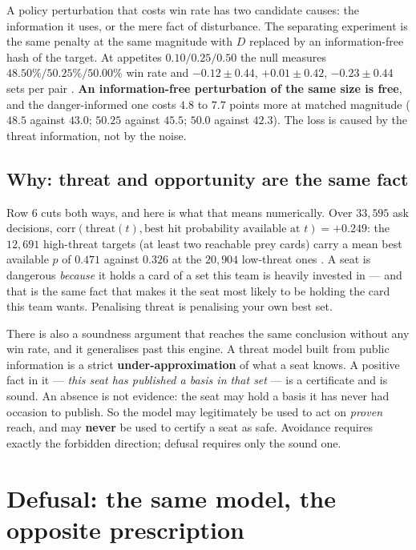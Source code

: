 \documentclass[11pt]{article}
\begin{document}
A policy perturbation that costs win rate has two candidate causes: the information it uses, or the
mere fact of disturbance. The separating experiment is the same penalty at the same magnitude with
$D$ replaced by an information-free hash of the target. At appetites $0.10 / 0.25 / 0.50$ the null
measures $48.50\% / 50.25\% / 50.00\%$ win rate and $-0.12 \pm 0.44$, $+0.01 \pm 0.42$, $-0.23 \pm
0.44$ sets per pair \cite{concession}. \textbf{An information-free perturbation of the same size is
free}, and the danger-informed one costs $4.8$ to $7.7$ points more at matched magnitude ($48.5$
against $43.0$; $50.25$ against $45.5$; $50.0$ against $42.3$). The loss is caused by the threat
information, not by the noise.

\subsection{Why: threat and opportunity are the same fact}
\label{sec:confound}

Row 6 cuts both ways, and here is what that means numerically. Over $33{,}595$ ask decisions,
$\mathrm{corr}(\text{threat}(t), \text{best hit probability available at } t) = \mathbf{+0.249}$:
the $12{,}691$ high-threat targets (at least two reachable prey cards) carry a mean best available
$p$ of $\mathbf{0.471}$ against $\mathbf{0.326}$ at the $20{,}904$ low-threat ones
\cite{concession}. A seat is dangerous \emph{because} it holds a card of a set this team is heavily
invested in --- and that is the same fact that makes it the seat most likely to be holding the card
this team wants. Penalising threat is penalising your own best set.

There is also a soundness argument that reaches the same conclusion without any win rate, and it
generalises past this engine. A threat model built from public information is a strict
\textbf{under-approximation} of what a seat knows. A positive fact in it --- \emph{this seat has
published a basis in that set} --- is a certificate and is sound. An absence is not evidence: the
seat may hold a basis it has never had occasion to publish. So the model may legitimately be used to
act on \emph{proven} reach, and may \textbf{never} be used to certify a seat as safe. Avoidance
requires exactly the forbidden direction; defusal requires only the sound one.

\section{Defusal: the same model, the opposite prescription}
\label{sec:defuse}
\end{document}
